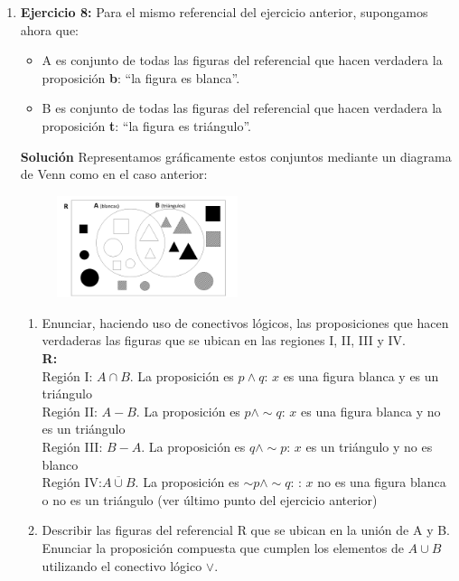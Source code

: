 \documentclass[12pt]{article}
\theoremstyle{definition}
\theoremstyle{remark}
\begin{document}
\begin{enumerate}
\item  \textbf{Ejercicio 8:} Para el mismo referencial del ejercicio anterior, supongamos ahora que:
\begin{itemize}
\setlength\itemsep{0em}
\item A es conjunto de todas las figuras del referencial que hacen verdadera la proposición \textbf{b}: “la figura es blanca”.
\item B es conjunto de todas las figuras del referencial que hacen verdadera la proposición \textbf{t}: “la figura es triángulo”. 
\end{itemize}

\noindent
\textbf{Solución} 
Representamos gráficamente estos conjuntos mediante un diagrama de Venn como en el caso anterior:
\begin{figure}[H]
\centering
\includegraphics[width=0.5\textwidth]{8a}
\end{figure}

\begin{enumerate}
\item Enunciar, haciendo uso de conectivos lógicos, las proposiciones que hacen verdaderas las figuras que se ubican en las regiones  I, II, III y IV.\\
\textbf{R:} \\
Región I: $A\cap B$. La proposición es  $p \wedge q$: $x$ es una figura blanca y es un triángulo\\
Región II: $A- B$. La proposición es  $p \wedge \sim q$: $x$ es una figura blanca y no es un triángulo\\
Región III: $B -  A$. La proposición es  $q \wedge \sim p$: $x$ es un triángulo y no es blanco\\
Región IV:$\overline{A\cup B}$. La proposición es  $\sim p \wedge \sim q$: : $x$  no es una figura blanca o no es un triángulo (ver último punto del ejercicio anterior)\\

\item Describir las figuras del referencial R que se ubican en la unión de A y B. Enunciar la proposición compuesta que cumplen los elementos de  $A\cup B$ utilizando el conectivo lógico  $\vee$.


\end{enumerate}
\end{enumerate}
\end{document}
